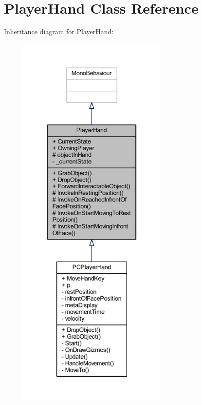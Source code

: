 \hypertarget{class_player_hand}{}\section{Player\+Hand Class Reference}
\label{class_player_hand}


Inheritance diagram for Player\+Hand\+:
\nopagebreak
\begin{figure}[H]
\begin{center}
\leavevmode
\includegraphics[height=550pt]{class_player_hand__inherit__graph}
\end{center}
\end{figure}


